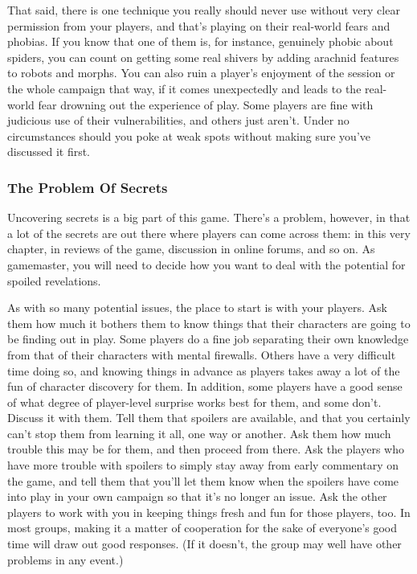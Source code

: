That said, there is one technique you really should never use without very clear permission from your players, and that's playing on their real-world fears and phobias. If you know that one of them is, for instance, genuinely phobic about spiders, you can count on getting some real shivers by adding arachnid features to robots and morphs. You can also ruin a player's enjoyment of the session or the whole campaign that way, if it comes unexpectedly and leads to the real-world fear drowning out the experience of play. Some players are fine with judicious use of their vulnerabilities, and others just aren't. Under no circumstances should you poke at weak spots without making sure you've discussed it first. 

\subsubsection{The Problem Of Secrets } 

Uncovering secrets is a big part of this game. There's a problem, however, in that a lot of the secrets are out there where players can come across them: in this very chapter, in reviews of the game, discussion in online forums, and so on. As gamemaster, you will need to decide how you want to deal with the potential for spoiled revelations. 

As with so many potential issues, the place to start is with your players. Ask them how much it bothers them to know things that their characters are going to be finding out in play. Some players do a fine job separating their own knowledge from that of their characters with mental firewalls. Others have a very difficult time doing so, and knowing things in advance as players takes away a lot of the fun of character discovery for them. In addition, some players have a good sense of what degree of player-level surprise works best for them, and some don't. Discuss it with them. Tell them that spoilers are available, and that you certainly can't stop them from learning it all, one way or another. Ask them how much trouble this may be for them, and then proceed from there. Ask the players who have more trouble with spoilers to simply stay away from early commentary on the game, and tell them that you'll let them know when the spoilers have come into play in your own campaign so that it's no longer an issue. Ask the other players to work with you in keeping things fresh and fun for those players, too. In most groups, making it a matter of cooperation for the sake of everyone's good time will draw out good responses. (If it doesn't, the group may well have other problems in any event.) 

